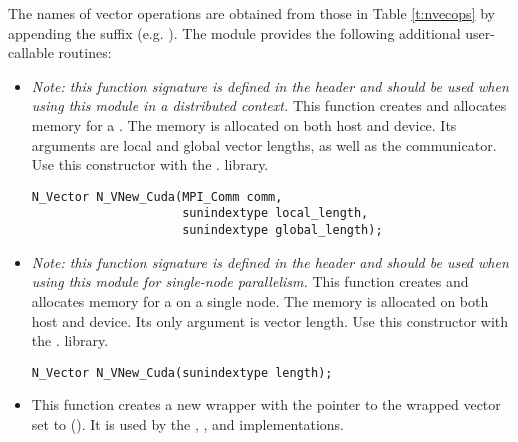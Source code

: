 The names of vector operations are obtained from those in
Table \ref{t:nvecops} by appending the suffix  (e.g. ).
The module {\nveccuda}  provides the following additional user-callable routines:
\begin{itemize}



\item {}

  \textit{Note: this function signature is defined in the header 
    and should be used when using this module in a distributed context.}
  This function creates and allocates memory for a {\cuda} .
  The memory is allocated on both host and device. Its arguments are local
  and global vector lengths, as well as the {\mpi} communicator. Use this 
  constructor with the . library.

\begin{verbatim}
N_Vector N_VNew_Cuda(MPI_Comm comm,
                     sunindextype local_length,
                     sunindextype global_length);
\end{verbatim}



\item {}

  \textit{Note: this function signature is defined in the header 
    and should be used when using this module for single-node parallelism.}
  This function creates and allocates memory for a {\cuda} 
  on a single node. The memory is allocated on both host and device.
  Its only argument is vector length. Use this constructor with the 
  . library.

\begin{verbatim}
N_Vector N_VNew_Cuda(sunindextype length);
\end{verbatim}



\item {}

  This function creates a new {\nvector} wrapper with the pointer to
  the wrapped {\cuda} vector set to (). It is used by the
  , , and 
  implementations.


\end{itemize}
